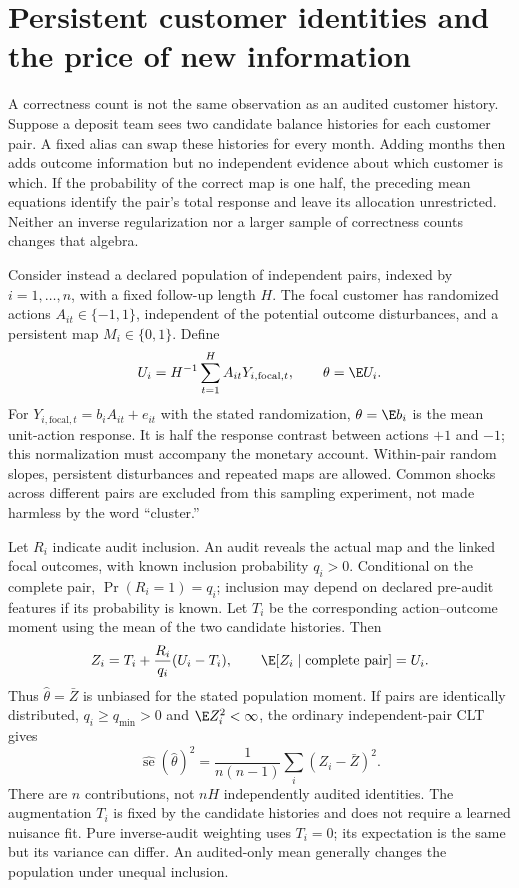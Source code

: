 \section{Persistent customer identities and the price of new information}
\label{c7:persistent-audits}
A correctness count is not the same observation as an audited customer
history. Suppose a deposit team sees two candidate balance histories for
each customer pair. A fixed alias can swap these histories for every month.
Adding months then adds outcome information but no independent evidence about
which customer is which. If the probability of the correct map is one half,
the preceding mean equations identify the pair's total response and leave
its allocation unrestricted. Neither an inverse regularization nor a larger
sample of correctness counts changes that algebra.

Consider instead a declared population of independent pairs, indexed by
$i=1,\ldots,n$, with a fixed follow-up length $H$. The focal customer has
randomized actions $A_{it}\in\{-1,1\}$, independent of the potential outcome
disturbances, and a persistent map $M_i\in\{0,1\}$. Define
\[
 U_i=H^{-1}\sum_{t=1}^H A_{it}Y_{i,\mathrm{focal},t},\qquad
 \theta=\E U_i.
\]
For $Y_{i,\mathrm{focal},t}=b_i A_{it}+e_{it}$ with the stated randomization,
$\theta=\E b_i$ is the mean unit-action response. It is half the response
contrast between actions $+1$ and $-1$; this normalization must accompany
the monetary account. Within-pair random slopes, persistent disturbances and
repeated maps are allowed. Common shocks across different pairs are excluded
from this sampling experiment, not made harmless by the word ``cluster.''

Let $R_i$ indicate audit inclusion. An audit reveals the actual map and the
linked focal outcomes, with known inclusion probability $q_i>0$. Conditional
on the complete pair, $\Pr(R_i=1)=q_i$; inclusion may depend on declared
pre-audit features if its probability is known. Let $T_i$ be the corresponding
action--outcome moment using the mean of the two candidate histories. Then
\begin{equation}
 Z_i=T_i+\frac{R_i}{q_i}(U_i-T_i),\qquad
 \E[Z_i\mid\text{complete pair}]=U_i.
 \label{c7:audit-score}
\end{equation}
Thus $\widehat\theta=\bar Z$ is unbiased for the stated population moment.
If pairs are identically distributed, $q_i\ge q_{\min}>0$ and
$\E Z_i^2<\infty$, the ordinary independent-pair CLT gives
\[
 \widehat{\operatorname{se}}(\widehat\theta)^2
   =\frac{1}{n(n-1)}\sum_i(Z_i-\bar Z)^2.
\]
There are $n$ contributions, not $nH$ independently audited identities.
The augmentation $T_i$ is fixed by the candidate histories and does not
require a learned nuisance fit. Pure inverse-audit weighting uses $T_i=0$;
its expectation is the same but its variance can differ. An audited-only
mean generally changes the population under unequal inclusion.

